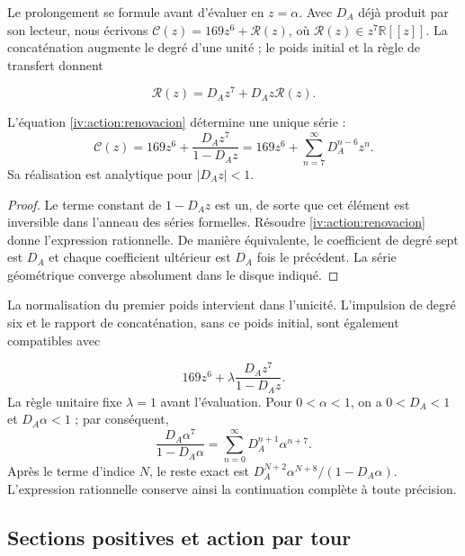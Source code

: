 Le prolongement se formule avant d’évaluer en \(z=\alpha\).
Avec \(D_A\) déjà produit par son lecteur, nous écrivons
\(\mathscr C(z)=169z^6+\mathscr R(z)\), où
\(\mathscr R(z)\in z^7\mathbb R[[z]]\).
La concaténation augmente le degré d’une unité ; le poids initial
et la règle de transfert donnent

\begin{equation}
 \mathscr R(z)=D_Az^7+D_Az\mathscr R(z).
 \label{iv:action:renovacion}
\end{equation}

\begin{proposition}
\label{iv:action:unicidad-renovacion}
L’équation \eqref{iv:action:renovacion} détermine une unique série :
\begin{equation}
 \mathscr C(z)=169z^6+\frac{D_Az^7}{1-D_Az}
             =169z^6+\sum_{n=7}^{\infty}D_A^{n-6}z^n.
 \label{iv:action:serie-renovacion}
\end{equation}
Sa réalisation est analytique pour \(|D_Az|<1\).
\end{proposition}
\begin{proof}
Le terme constant de \(1-D_Az\) est un, de sorte que cet
élément est inversible dans l’anneau des séries formelles.
Résoudre \eqref{iv:action:renovacion} donne l’expression rationnelle.
De manière équivalente, le coefficient de degré sept est \(D_A\) et chaque
coefficient ultérieur est \(D_A\) fois le précédent. La série
géométrique converge absolument dans le disque indiqué.
\end{proof}

La normalisation du premier poids intervient dans l’unicité.
L’impulsion de degré six et le rapport de concaténation, sans ce
poids initial, sont également compatibles avec

\[
 169z^6+\lambda\frac{D_Az^7}{1-D_Az}.
\]
La règle unitaire fixe \(\lambda=1\) avant l’évaluation.
Pour \(0<\alpha<1\), on a \(0<D_A<1\) et \(D_A\alpha<1\) ;
par conséquent,
\begin{equation}
 \frac{D_A\alpha^7}{1-D_A\alpha}
   =\sum_{n=0}^{\infty}D_A^{n+1}\alpha^{n+7}.
 \label{iv:action:cola}
\end{equation}
Après le terme d’indice \(N\), le reste exact est
\(D_A^{N+2}\alpha^{N+8}/(1-D_A\alpha)\). L’expression rationnelle
conserve ainsi la continuation complète à toute précision.

\subsection{Sections positives et action par tour
}
\label{iv:action:secciones}

